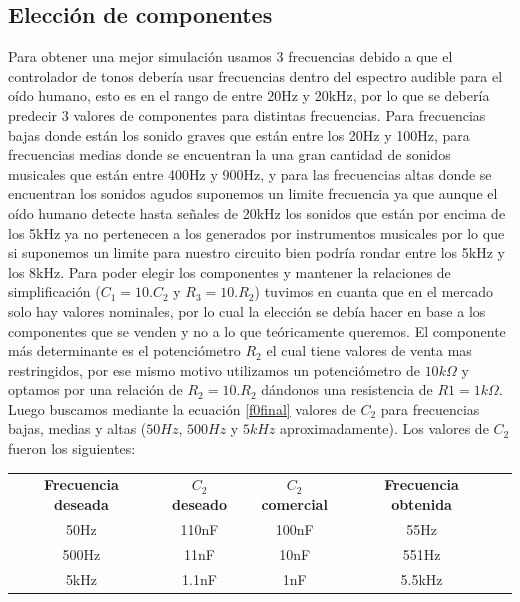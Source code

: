 \subsection{Elección de componentes}
Para obtener una mejor simulación usamos 3 frecuencias debido a que el controlador de tonos debería usar frecuencias dentro del espectro audible para el oído humano, esto es en el rango de entre 20Hz y 20kHz, por lo que se debería predecir 3 valores de componentes para distintas frecuencias. Para frecuencias bajas donde están los sonido graves que están entre los 20Hz y 100Hz, para frecuencias medias donde se encuentran la una gran cantidad de sonidos musicales que están entre 400Hz y 900Hz, y para las frecuencias altas donde se encuentran los sonidos agudos suponemos un limite frecuencia ya que aunque el oído humano detecte hasta señales de 20kHz los sonidos que están por encima de los 5kHz ya no pertenecen a los generados por instrumentos musicales por lo que si suponemos un limite para nuestro circuito bien podría rondar entre los 5kHz y los 8kHz.
Para poder elegir los componentes y mantener la relaciones de simplificación ($C_1=10.C_2$ y $R_3=10.R_2$) tuvimos en cuanta que en el mercado solo hay valores nominales, por lo cual la elección se debía hacer en base a los componentes que se venden y no a lo que teóricamente queremos. El componente más determinante es el potenciómetro $R_2$ el cual tiene valores de venta mas restringidos, por ese mismo motivo utilizamos un potenciómetro de $10k\Omega$ y optamos por una relación de $R_2=10.R_2$ dándonos una resistencia de $R1=1k\Omega$. Luego buscamos mediante la ecuación \ref{f0final} valores de $C_2$ para frecuencias bajas, medias y altas ($50Hz$, $500Hz$ y $5kHz$ aproximadamente). Los valores de $C_2$ fueron los siguientes:

\begin{table}[h]
\centering
\begin{tabular}{|c|c|c|c|l}
\cline{1-4}
\textbf{Frecuencia deseada} & \textbf{$C_2$ deseado} & \textbf{$C_2$ comercial} & \textbf{Frecuencia obtenida} &  \\ \cline{1-4}
50Hz                        & 110nF                 & 100nF                   & 55Hz                         &  \\ \cline{1-4}
500Hz                       & 11nF                  & 10nF                    & 551Hz                        &  \\ \cline{1-4}
5kHz                        & 1.1nF                 & 1nF                     & 5.5kHz                       &  \\ \cline{1-4}
\end{tabular}
\end{table}

